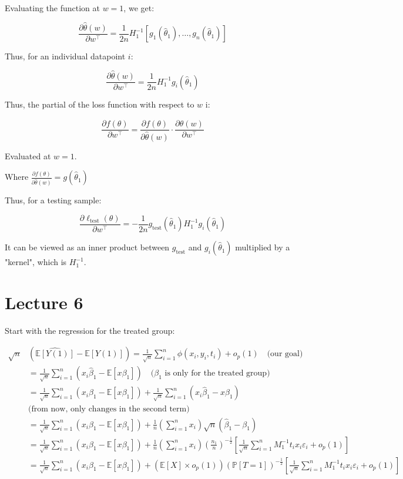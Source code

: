\documentclass{article}
\begin{document}
Evaluating the function at $w = 1$, we get:

$$
\frac{\partial \hat{\theta}(w)}{\partial w^{\top}}
= \frac{1}{2n} H_1^{-1} \left[
    g_1(\hat{\theta}_1), \ldots, g_n(\hat{\theta}_1)
\right]
$$

Thus, for an individual datapoint $i$:

$$
\frac{\partial \hat{\theta}(w)}{\partial w^{\top}}
= \frac{1}{2n} H_1^{-1} g_i(\hat{\theta}_1)
$$

Thus, the partial of the loss function with respect to $w$ i:

$$
\frac{\partial f(\theta)}{\partial w^{\top}}
=
\frac{\partial f(\theta)}{\partial \hat{\theta}(w)}
\cdot
\frac{\partial \hat{\theta}(w)}{\partial w^{\top}}
$$

Evaluated at $w = 1$.

Where $\frac{\partial f(\theta)}{\partial \hat{\theta}(w)} = g(\hat{\theta}_1)$


Thus, for a testing sample:

$$
\frac{\partial \ell_{\text{test}}(\theta)}{\partial w^{\top}}
=
- \frac{1}{2n} g_{\text{test}} (\hat{\theta}_1) H_1^{-1} g_i (\hat{\theta}_1)
$$

It can be viewed as an inner product between $g_{\text{test}}$ and $g_i (\hat{\theta}_1)$ multiplied by a "kernel", which is $H_1^{-1}$.


 
\section{Lecture 6}

Start with the regression for the treated group:

\begin{align*}
    \sqrt{n} & (\hat{\mathbb{E}[Y(1)]} - \mathbb{E}[Y(1)])
    = \frac{1}{\sqrt{n}} \sum_{i=1}^{n} \phi (x_i, y_i, t_i) + o_p(1) \quad \text{(our goal)}\\
    &= \frac{1}{\sqrt{n}} \sum_{i=1}^{n} (x_i \hat{\beta}_1 - \mathbb{E}[x \beta_1])  \quad \text{($\beta_1$ is only for the treated group)} \\
    &= \frac{1}{\sqrt{n}} \sum_{i=1}^{n} (x_i \beta_1 - \mathbb{E}[x \beta_1])
    + \frac{1}{\sqrt{n}} \sum_{i=1}^{n} (x_i \hat{\beta}_1 - x \beta_1) 
    \\
    & \text{(from now, only changes in the second term)} \\
    &= \frac{1}{\sqrt{n}} \sum_{i=1}^{n} (x_i \beta_1 - \mathbb{E}[x \beta_1])
    + \frac{1}{n} \left(\sum_{i=1}^{n} x_i\right) \sqrt{n} (\hat{\beta}_1 - \beta_1) \\
    &= \frac{1}{\sqrt{n}} \sum_{i=1}^{n} (x_i \beta_1 - \mathbb{E}[x \beta_1])
    + \frac{1}{n} \left(\sum_{i=1}^{n} x_i\right) \left( \frac{n_1}{n} \right)^{-\frac{1}{2}} \left[ \frac{1}{\sqrt{n}} \sum_{i=1}^n M_1^{-1} t_i x_i \varepsilon_i + o_p(1)\right] \\
    &= \frac{1}{\sqrt{n}} \sum_{i=1}^{n} (x_i \beta_1 - \mathbb{E}[x \beta_1])
    + \left( \mathbb{E}[X] \times o_p(1) \right) \left( \mathbb{P}[T=1] \right)^{-\frac{1}{2}} \left[ \frac{1}{\sqrt{n}} \sum_{i=1}^n M_1^{-1} t_i x_i \varepsilon_i + o_p(1)\right]
\end{align*}
\end{document}
